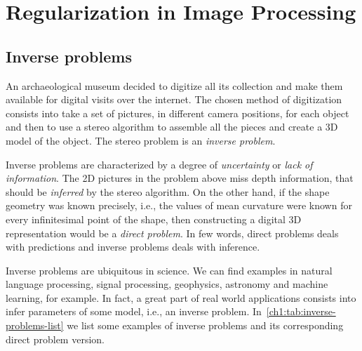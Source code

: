 \chapter{Regularization in Image Processing}
\label{chapter:regularization}

\section{Inverse problems}

An archaeological museum decided to digitize all its collection and make them available for digital visits over the internet. The chosen method of digitization consists into take a set of pictures, in different camera positions, for each object and then to use a stereo algorithm to assemble all the pieces and create a 3D model of the object. The stereo problem is an \emph{inverse problem}.

Inverse problems are characterized by a degree of \emph{uncertainty} or \emph{lack of information}. The 2D pictures in the problem above miss depth information, that should be \emph{inferred} by the stereo algorithm. On the other hand, if the shape geometry was known precisely, i.e., the values of mean curvature were known for every infinitesimal point of the shape, then constructing a digital 3D representation would be a \emph{direct problem}. In few words, direct problems deals with predictions and inverse problems deals with inference.

Inverse problems are ubiquitous in science. We can find examples in natural language processing, signal processing, geophysics, astronomy and machine learning, for example. In fact, a great part of real world applications consists into infer parameters of some model, i.e., an inverse problem. In~\cref{ch1:tab:inverse-problems-list} we list some examples of inverse problems and its corresponding direct problem version.

